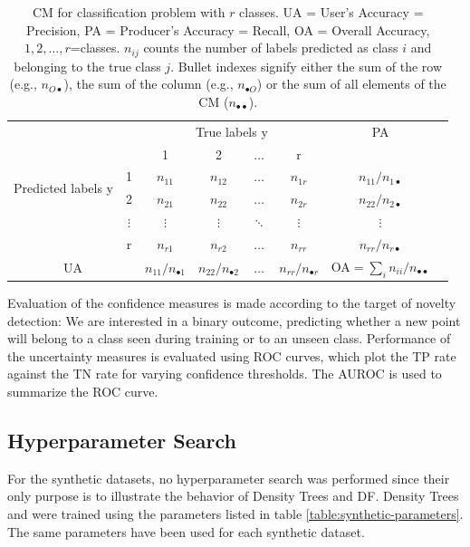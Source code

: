 \documentclass[10pt]{article}
\begin{document}
\begin{table}[H]
	\centering
	\begin{tabular}{cc|c|c|c|c|cl}
		& & \multicolumn{4}{c|}{True labels y}&PA\\
		\multirow{4}{*}{Predicted labels y} &  & 1& 2& $\hdots$ &r  &\\ \cline{1-7} 
		& 1 &  $n_{11}$ & $n_{12}$ & $\hdots$ & $n_{1r}$& $n_{11}/n_{1\bullet}$ \\ \cline{2-7} 
		& 2 & $n_{21}$ & $n_{22}$ &$\hdots$  &$n_{2r}$ &$n_{22}/n_{2\bullet}$\\ \cline{2-7} 
		& $\vdots$ & $\vdots$ & $\vdots$ &$\ddots$  &$\vdots$&$\vdots$\\ \cline{2-7} 
		& r & $n_{r1}$ & $n_{r2}$ &$\hdots$  & $n_{rr}$ & $n_{rr}/n_{r\bullet}$ \\\cline{1-7} 
		\multicolumn{2}{c|}{UA} & $n_{11}/n_{\bullet 1}$ & $n_{22}/n_{\bullet 2}$ & $\hdots$ & $n_{rr}/n_{\bullet r}$ & OA$=\sum_in_{ii}/n_{\bullet\bullet}$\\
	\end{tabular}
	\caption{\acrlong{CM} for classification problem with $r$ classes. UA = User's Accuracy = Precision, PA = Producer's Accuracy = Recall, OA = Overall Accuracy, $1,2,\hdots,r$=classes. $n_{ij}$ counts the number of labels predicted as class $i$ and belonging to the true class $j$. Bullet indexes signify either the sum of the row (e.g., $n_{O\bullet}$), the sum of the column (e.g., $n_{\bullet O}$) or the sum of all elements of the \acrlong{CM} ($n_{\bullet\bullet}$).}
	\label{table:cm}
\end{table}

Evaluation of the confidence measures is made according to the target of novelty detection: We are interested in a binary outcome, predicting whether a new point will belong to a class seen during training or to an unseen class. Performance of the uncertainty measures is evaluated using \gls{ROC} curves, which plot the \gls{TP} rate against the \gls{TN} rate for varying confidence thresholds.  The \gls{AUROC} is used to summarize the \gls{ROC} curve.


\subsection{Hyperparameter Search}
\label{subsec:hyperparameter-search}
For the synthetic datasets, no hyperparameter search was performed since their only purpose is to illustrate the behavior of Density Trees and \acrlong{DF}. Density Trees and  were trained using the parameters listed in table \ref{table:synthetic-parameters}. The same parameters have been used for each synthetic dataset.
\end{document}
